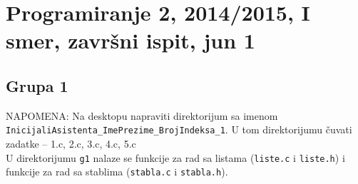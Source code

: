 \section{Programiranje 2, 2014/2015, I smer, zavr\v{s}ni ispit, jun 1}
\subsection{Grupa 1}

NAPOMENA: Na desktopu napraviti direktorijum sa imenom \verb|InicijaliAsistenta_ImePrezime_BrojIndeksa_1|.
U tom direktorijumu \v cuvati zadatke -- 1.c, 2.c, 3.c, 4.c, 5.c\\
U direktorijumu {\tt g1} nalaze se funkcije za rad sa listama ({\tt liste.c} i {\tt liste.h}) i
funkcije za rad sa stablima ({\tt stabla.c} i {\tt stabla.h}).  \\

\bigskip

